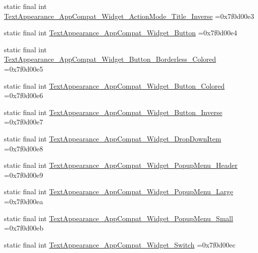\begin{DoxyCompactItemize}
\item 
static final int \mbox{\hyperlink{classcom_1_1example_1_1trainawearapplication_1_1_r_1_1style_adc0180a631db74374b11499f9079a731}{Text\+Appearance\+\_\+\+App\+Compat\+\_\+\+Widget\+\_\+\+Action\+Mode\+\_\+\+Title\+\_\+\+Inverse}} =0x7f0d00e3
\item 
static final int \mbox{\hyperlink{classcom_1_1example_1_1trainawearapplication_1_1_r_1_1style_af2dd944baaaff5abc97ef988cd437b04}{Text\+Appearance\+\_\+\+App\+Compat\+\_\+\+Widget\+\_\+\+Button}} =0x7f0d00e4
\item 
static final int \mbox{\hyperlink{classcom_1_1example_1_1trainawearapplication_1_1_r_1_1style_aab56cb3c70012f142619a71df6d7b50d}{Text\+Appearance\+\_\+\+App\+Compat\+\_\+\+Widget\+\_\+\+Button\+\_\+\+Borderless\+\_\+\+Colored}} =0x7f0d00e5
\item 
static final int \mbox{\hyperlink{classcom_1_1example_1_1trainawearapplication_1_1_r_1_1style_a1f3fcbc2637f2b92c08694d5add55b36}{Text\+Appearance\+\_\+\+App\+Compat\+\_\+\+Widget\+\_\+\+Button\+\_\+\+Colored}} =0x7f0d00e6
\item 
static final int \mbox{\hyperlink{classcom_1_1example_1_1trainawearapplication_1_1_r_1_1style_af77baa3cb7dc83a92232c5f26de0906e}{Text\+Appearance\+\_\+\+App\+Compat\+\_\+\+Widget\+\_\+\+Button\+\_\+\+Inverse}} =0x7f0d00e7
\item 
static final int \mbox{\hyperlink{classcom_1_1example_1_1trainawearapplication_1_1_r_1_1style_a82c7ff1c05d5fac9fe6a055b4bf56486}{Text\+Appearance\+\_\+\+App\+Compat\+\_\+\+Widget\+\_\+\+Drop\+Down\+Item}} =0x7f0d00e8
\item 
static final int \mbox{\hyperlink{classcom_1_1example_1_1trainawearapplication_1_1_r_1_1style_a926d93be9fdd81c7dd16d27b0b16de57}{Text\+Appearance\+\_\+\+App\+Compat\+\_\+\+Widget\+\_\+\+Popup\+Menu\+\_\+\+Header}} =0x7f0d00e9
\item 
static final int \mbox{\hyperlink{classcom_1_1example_1_1trainawearapplication_1_1_r_1_1style_aa257f72efb38178591eb360666deaba5}{Text\+Appearance\+\_\+\+App\+Compat\+\_\+\+Widget\+\_\+\+Popup\+Menu\+\_\+\+Large}} =0x7f0d00ea
\item 
static final int \mbox{\hyperlink{classcom_1_1example_1_1trainawearapplication_1_1_r_1_1style_ae77babb1253b90ca7196fbca906f13b9}{Text\+Appearance\+\_\+\+App\+Compat\+\_\+\+Widget\+\_\+\+Popup\+Menu\+\_\+\+Small}} =0x7f0d00eb
\item 
static final int \mbox{\hyperlink{classcom_1_1example_1_1trainawearapplication_1_1_r_1_1style_a965dce88298327402fc25af21e45db37}{Text\+Appearance\+\_\+\+App\+Compat\+\_\+\+Widget\+\_\+\+Switch}} =0x7f0d00ec

\end{DoxyCompactItemize}
